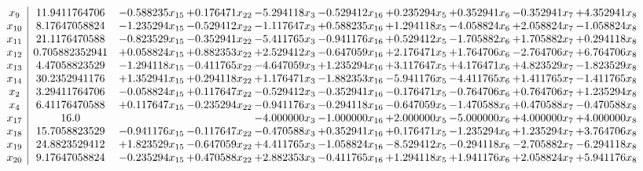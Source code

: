 \documentclass[10pt]{article}
\begin{document}
 \[\begin{array}{c| c c@{\hskip 2pt} c@{\hskip 2pt} c@{\hskip 2pt} c@{\hskip 2pt} c@{\hskip 2pt} c@{\hskip 2pt} c@{\hskip 2pt} c@{\hskip 2pt} }
 x_{9}   &  11.9411764706 & -0.588235 x_{15} & + 0.176471 x_{22} & -5.294118 x_{3} & -0.529412 x_{16} & + 0.235294 x_{5} & + 0.352941 x_{6} & -0.352941 x_{7} & + 4.352941 x_{8}\\
 x_{10}   &  8.17647058824 & -1.235294 x_{15} & -0.529412 x_{22} & -1.117647 x_{3} & + 0.588235 x_{16} & + 1.294118 x_{5} & -4.058824 x_{6} & + 2.058824 x_{7} & -1.058824 x_{8}\\
 x_{11}   &  21.1176470588 & -0.823529 x_{15} & -0.352941 x_{22} & -5.411765 x_{3} & -0.941176 x_{16} & + 0.529412 x_{5} & -1.705882 x_{6} & + 1.705882 x_{7} & + 0.294118 x_{8}\\
 x_{12}   &  0.705882352941 & + 0.058824 x_{15} & + 0.882353 x_{22} & + 2.529412 x_{3} & -0.647059 x_{16} & + 2.176471 x_{5} & + 1.764706 x_{6} & -2.764706 x_{7} & + 6.764706 x_{8}\\
 x_{13}   &  4.47058823529 & -1.294118 x_{15} & -0.411765 x_{22} & -4.647059 x_{3} & + 1.235294 x_{16} & + 3.117647 x_{5} & + 4.176471 x_{6} & + 4.823529 x_{7} & -1.823529 x_{8}\\
 x_{14}   &  30.2352941176 & + 1.352941 x_{15} & + 0.294118 x_{22} & + 1.176471 x_{3} & -1.882353 x_{16} & -5.941176 x_{5} & -4.411765 x_{6} & + 1.411765 x_{7} & -1.411765 x_{8}\\
 x_{2}   &  3.29411764706 & -0.058824 x_{15} & + 0.117647 x_{22} & -0.529412 x_{3} & -0.352941 x_{16} & -0.176471 x_{5} & -0.764706 x_{6} & + 0.764706 x_{7} & + 1.235294 x_{8}\\
 x_{4}   &  6.41176470588 & + 0.117647 x_{15} & -0.235294 x_{22} & -0.941176 x_{3} & -0.294118 x_{16} & -0.647059 x_{5} & -1.470588 x_{6} & + 0.470588 x_{7} & -0.470588 x_{8}\\
 x_{17}   &  16.0  &    &   & -4.000000 x_{3} & -1.000000 x_{16} & + 2.000000 x_{5} & -5.000000 x_{6} & + 4.000000 x_{7} & + 4.000000 x_{8}\\
 x_{18}   &  15.7058823529 & -0.941176 x_{15} & -0.117647 x_{22} & -0.470588 x_{3} & + 0.352941 x_{16} & + 0.176471 x_{5} & -1.235294 x_{6} & + 1.235294 x_{7} & + 3.764706 x_{8}\\
 x_{19}   &  24.8823529412 & + 1.823529 x_{15} & -0.647059 x_{22} & + 4.411765 x_{3} & -1.058824 x_{16} & -8.529412 x_{5} & -0.294118 x_{6} & -2.705882 x_{7} & -6.294118 x_{8}\\
 x_{20}   &  9.17647058824 & -0.235294 x_{15} & + 0.470588 x_{22} & + 2.882353 x_{3} & -0.411765 x_{16} & + 1.294118 x_{5} & + 1.941176 x_{6} & + 2.058824 x_{7} & + 5.941176 x_{8}\\

\end{array}\]
\end{document}
